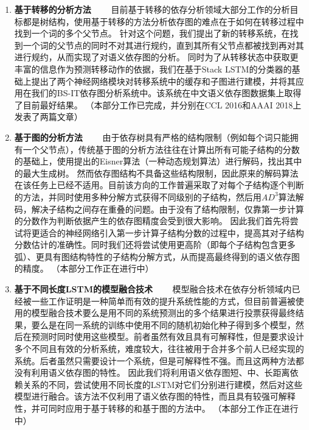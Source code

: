 \begin{enumerate}
	\item \textbf{基于转移的分析方法}
	\ \ \ \ 目前基于转移的依存分析领域大部分工作的分析目标都是树结构，使用基于转移的方法分析依存图的难点在于如何在转移过程中找到一个词的多个父节点。
	针对这个问题，我们提出了新的转移系统，在找到一个词的父节点的同时不对其进行规约，直到其所有父节点都被找到再对其进行规约，从而实现了对语义依存图的分析。
	同时为了从转移状态中获取更丰富的信息作为预测转移动作的依据，我们在基于Stack LSTM的分类器的基础上提出了两个神经网络模块对转移系统中的缓存和子图进行建模，并将其应用在我们的BS-IT依存图分析系统中。该系统在中文语义依存图数据集上取得了目前最好结果。
	（本部分工作已完成，并分别在CCL 2016和AAAI 2018上发表了两篇文章）
	
	\item \textbf{基于图的分析方法}
	\ \ \ \ 由于依存树具有严格的结构限制（例如每个词只能拥有一个父节点），传统基于图的分析方法往往在计算出所有可能子结构的分数的基础上，使用提出的Eisner算法（一种动态规划算法）进行解码，找出其中的最大生成树。
	然而依存图结构不具备这些结构限制，因此原来的解码算法在该任务上已经不适用。目前该方向的工作普遍采取了对每个子结构逐个判断的方法，并同时使用多种分解方式获得不同级别的子结构，然后用$AD^3$算法解码，解决子结构之间存在重叠的问题。由于没有了结构限制，仅靠第一步计算的分数作为判断依据产生的依存图精度会受到很大影响。
	因此我们首先将尝试将更适合的神经网络引入第一步计算子结构分数的过程中，提高其对子结构分数估计的准确性。同时我们还将尝试使用更高阶（即每个子结构包含更多弧）、更具有图结构特性的子结构分解方式，从而提高最终得到的语义依存图的精度。
	（本部分工作正在进行中）
	
	\item \textbf{基于不同长度LSTM的模型融合技术}
	\ \ \ \ 模型融合技术在依存分析领域内已经被一些工作证明是一种简单而有效的提升系统性能的方式，但目前普遍被使用的模型融合技术要么是用不同的系统预测出的多个结果进行投票获得最终结果，要么是在同一系统的训练中使用不同的随机初始化种子得到多个模型，然后在预测时同时使用这些模型。前者虽然有效且具有可解释性，但是要求设计多个不同且有效的分析系统，难度较大，往往被用于合并多个前人已经实现的系统。后者虽然只需要设计一个系统，但是可解释性不强。而且这两种方法都没有利用语义依存图的特性。
	因此我们将利用语义依存图短、中、长距离依赖关系的不同，尝试使用不同长度的LSTM对它们分别进行建模，然后对这些模型进行融合。该方法不仅利用了语义依存图的特性，而且具有较强可解释性，并可同时应用于基于转移的和基于图的方法中。
	（本部分工作正在进行中）
	

\end{enumerate}

